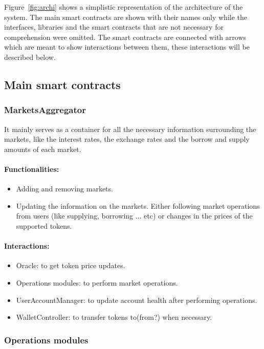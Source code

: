 Figure~\ref{fig:archi} shows a simplistic representation of the architecture of the system. The main smart contracts are shown with their names only while the interfaces, libraries and the smart contracts that are not necessary for comprehension were omitted. The smart contracts are connected with arrows which are meant to show interactions between them, these interactions will be described below.

\subsection{Main smart contracts}

\subsubsection{MarketsAggregator}

It mainly serves as a container for all the necessary information surrounding the markets, like the interest rates, the exchange rates and the borrow and supply amounts of each market.

\paragraph*{Functionalities:}
\begin{itemize}
  \item Adding and removing markets. 
  \item Updating the information on the markets. Either following market operations from users (like supplying, borrowing ... etc) or changes in the prices of the supported tokens. 
\end{itemize}

\paragraph*{Interactions:}
\begin{itemize}
  \item Oracle: to get token price updates.
  \item Operations modules: to perform market operations.
  \item UserAccountManager: to update account health after performing operations.
  \item WalletController: to transfer tokens to(from?) when necessary.
\end{itemize}

\subsubsection{Operations modules}

